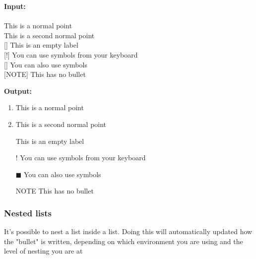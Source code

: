 \begin{multicols}{2}
    \begin{minipage}{\linewidth}
        \textbf{Input:} \\
         \\
         This is a normal point \\
         This is a second normal point \\
        [] This is an empty label \\
        [!] You can use symbols from your keyboard \\
        [] You can also use symbols \\
        [NOTE] This has no bullet
    \end{minipage}

    \begin{minipage}{\linewidth}
        \textbf{Output:} \\
        \begin{enumerate}
            \item This is a normal point 
            \item This is a second normal point 
            \item [] This is an empty label 
            \item [!] You can use symbols from your keyboard
            \item [$\blacksquare$] You can also use symbols
            \item [NOTE] This has no bullet
        \end{enumerate}
    \end{minipage}
\end{multicols}

\subsubsection{Nested lists}
It's possible to nest a list inside a list. Doing this will automatically updated
how the "bullet" is written, depending on which environment you are using and
the level of nesting you are at

